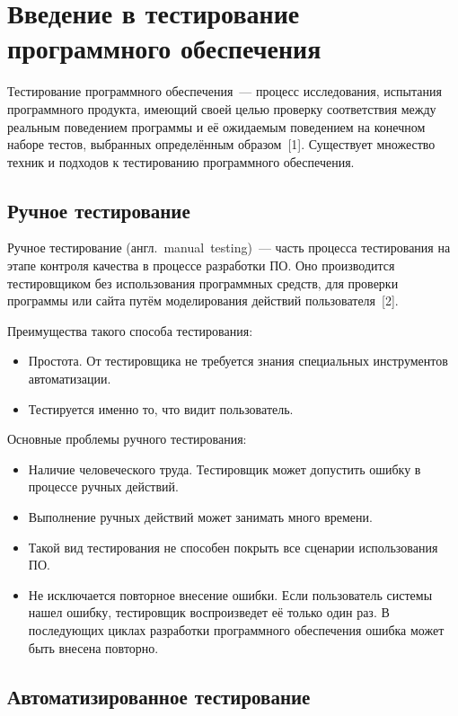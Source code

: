 \section{Введение в тестирование программного обеспечения} \label{section_1}

Тестирование программного обеспечения~--- процесс исследования, испытания программного продукта, имеющий своей целью проверку соответствия между реальным поведением программы и её ожидаемым поведением на конечном наборе тестов, выбранных определённым образом~[1]. Существует множество техник и подходов к тестированию программного обеспечения.  

\subsection{Ручное тестирование} \label{subsection_11}

Ручное тестирование (англ.~manual~testing)~--- часть процесса тестирования на этапе контроля качества в процессе разработки ПО. Оно производится тестировщиком без использования программных средств, для проверки программы или сайта путём моделирования действий пользователя~[2]. 

Преимущества такого способа тестирования:

\begin{itemize}
	\item Простота. От тестировщика не требуется знания специальных инструментов автоматизации.
	\item Тестируется именно то, что видит пользователь.
\end{itemize} 

Основные проблемы ручного тестирования:
\begin{itemize}
	\item Наличие человеческого труда. Тестировщик может допустить ошибку в процессе ручных действий.
	\item Выполнение ручных действий может занимать много времени.
	\item Такой вид тестирования не способен покрыть все сценарии использования ПО. 
	\item Не исключается повторное внесение ошибки. Если пользователь системы нашел ошибку, тестировщик воспроизведет её только один раз. В последующих циклах разработки программного обеспечения ошибка может быть внесена повторно.
\end{itemize} 


\subsection{Автоматизированное тестирование} \label{subsection_12}
 
